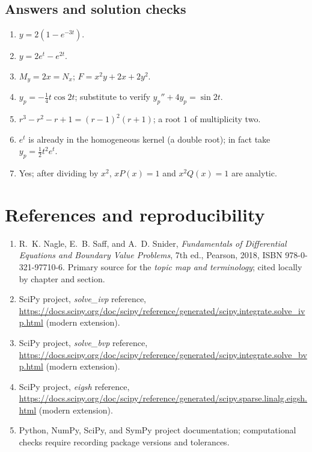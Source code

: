 \documentclass[11pt,letterpaper,oneside]{report}
\theoremstyle{definition}\newtheorem{definition}[theorem]{Definition}
\theoremstyle{remark}\newtheorem{remark}[theorem]{Remark}
\begin{document}
\section{Answers and solution checks}
\begin{enumerate}
\item $y=2(1-e^{-3t})$.
\item $y=2e^t-e^{2t}$.
\item $M_y=2x=N_x$; $F=x^2y+2x+2y^2$.
\item $y_p=-\tfrac14 t\cos 2t$; substitute to verify $y_p''+4y_p=\sin2t$.
\item $r^3-r^2-r+1=(r-1)^2(r+1)$; a root $1$ of multiplicity two.
\item $e^t$ is already in the homogeneous kernel (a double root); in fact take $y_p=\tfrac12 t^2e^t$.
\item Yes; after dividing by $x^2$, $xP(x)=1$ and $x^2Q(x)=1$ are analytic.
\end{enumerate}

\appendix
\chapter{References and reproducibility}
\begin{enumerate}
\item R.~K. Nagle, E.~B. Saff, and A.~D. Snider, \emph{Fundamentals of Differential Equations and Boundary Value Problems}, 7th ed., Pearson, 2018, ISBN 978-0-321-97710-6. Primary source for the \emph{topic map and terminology}; cited locally by chapter and section.
\item SciPy project, \emph{solve\_ivp} reference, \url{https://docs.scipy.org/doc/scipy/reference/generated/scipy.integrate.solve_ivp.html} (modern extension).
\item SciPy project, \emph{solve\_bvp} reference, \url{https://docs.scipy.org/doc/scipy/reference/generated/scipy.integrate.solve_bvp.html} (modern extension).
\item SciPy project, \emph{eigsh} reference, \url{https://docs.scipy.org/doc/scipy/reference/generated/scipy.sparse.linalg.eigsh.html} (modern extension).
\item Python, NumPy, SciPy, and SymPy project documentation; computational checks require recording package versions and tolerances.
\end{enumerate}
\end{document}
